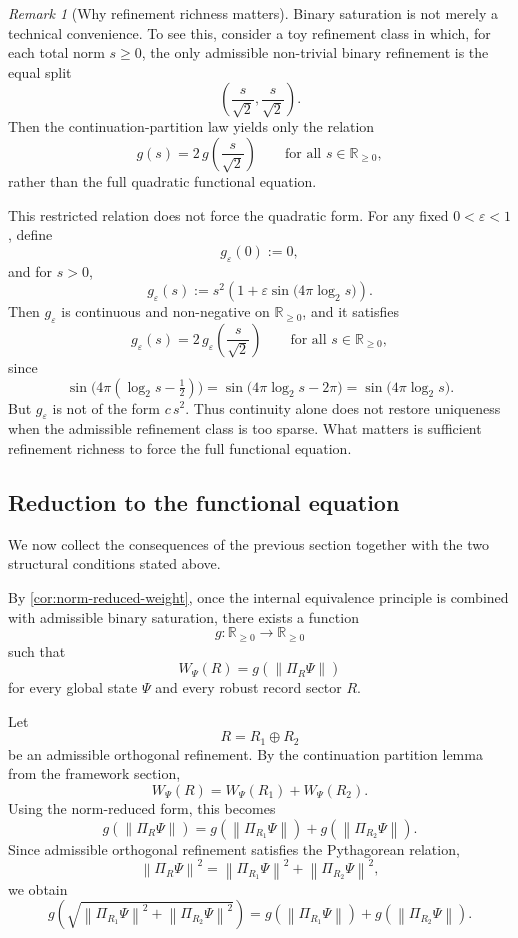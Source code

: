 \documentclass[11pt]{article}
\theoremstyle{remark}
\newtheorem{remark}{Remark}
\numberwithin{equation}{section}
\newcommand{\RR}{\mathbb{R}}
\newcommand{\Wpsi}[1]{W_{\Psi}\!\left(#1\right)}
\newcommand{\Proj}[1]{\Pi_{#1}}
\newcommand{\norm}[1]{\left\lVert #1 \right\rVert}
\begin{document}
\begin{remark}[Why refinement richness matters]
\label{rem:equal-split-counterexample}
Binary saturation is not merely a technical convenience. To see this, consider a toy refinement class in which, for each total norm $s \geq 0$, the only admissible non-trivial binary refinement is the equal split
\[
  \left(\frac{s}{\sqrt{2}}, \frac{s}{\sqrt{2}}\right).
\]
Then the continuation-partition law yields only the relation
\[
  g(s) = 2\,g\!\left(\frac{s}{\sqrt{2}}\right)
  \qquad \text{for all } s \in \RR_{\geq 0},
\]
rather than the full quadratic functional equation.

This restricted relation does not force the quadratic form. For any fixed
$0 < \varepsilon < 1$, define
\[
  g_{\varepsilon}(0) := 0,
\]
and for $s > 0$,
\[
  g_{\varepsilon}(s)
  := s^2\!\left(1 + \varepsilon \sin\!\bigl(4\pi \log_2 s\bigr)\right).
\]
Then $g_{\varepsilon}$ is continuous and non-negative on
$\RR_{\geq 0}$, and it satisfies
\[
  g_{\varepsilon}(s)
  = 2\,g_{\varepsilon}\!\left(\frac{s}{\sqrt{2}}\right)
  \qquad \text{for all } s \in \RR_{\geq 0},
\]
since
\[
  \sin\!\bigl(4\pi(\log_2 s - \tfrac{1}{2})\bigr)
  = \sin\!\bigl(4\pi \log_2 s - 2\pi\bigr)
  = \sin\!\bigl(4\pi \log_2 s\bigr).
\]
But $g_{\varepsilon}$ is not of the form $c\,s^2$. Thus continuity alone
does not restore uniqueness when the admissible refinement class is too
sparse. What matters is sufficient refinement richness to force the full
functional equation.
\end{remark}

\subsection{Reduction to the functional equation}

We now collect the consequences of the previous section together with the two structural conditions stated above.

By \cref{cor:norm-reduced-weight}, once the internal equivalence principle is combined with admissible binary saturation, there exists a function
\[
g : \RR_{\geq 0} \to \RR_{\geq 0}
\]
such that
\[
\Wpsi{R} = g\!\left(\norm{\Proj{R}\Psi}\right)
\]
for every global state $\Psi$ and every robust record sector $R$.

Let
\[
R = R_1 \oplus R_2
\]
be an admissible orthogonal refinement. By the continuation partition lemma from the framework section,
\[
\Wpsi{R} = \Wpsi{R_1} + \Wpsi{R_2}.
\]
Using the norm-reduced form, this becomes
\[
g\!\left(\norm{\Proj{R}\Psi}\right)
=
g\!\left(\norm{\Proj{R_1}\Psi}\right)
+
g\!\left(\norm{\Proj{R_2}\Psi}\right).
\]
Since admissible orthogonal refinement satisfies the Pythagorean relation,
\[
\norm{\Proj{R}\Psi}^2
=
\norm{\Proj{R_1}\Psi}^2 + \norm{\Proj{R_2}\Psi}^2,
\]
we obtain
\[
g\!\left(\sqrt{
\norm{\Proj{R_1}\Psi}^2 + \norm{\Proj{R_2}\Psi}^2
}\right)
=
g\!\left(\norm{\Proj{R_1}\Psi}\right)
+
g\!\left(\norm{\Proj{R_2}\Psi}\right).
\]
\end{document}
